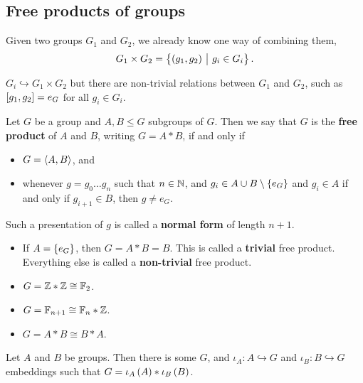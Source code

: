 \subsection{Free products of groups}

Given two groups $ G_1 $ and $ G_2 $, we already know one way of combining them,
$$ G_1 \times G_2 = \cbr{\br{g_1, g_2} \st g_i \in G_i}. $$

\begin{note*}
$ G_i \hookrightarrow G_1 \times G_2 $ but there are non-trivial relations between $ G_1 $ and $ G_2 $, such as $ \sbr{g_1, g_2} = e_G $ for all $ g_i \in G_i $.
\end{note*}

\begin{definition}
Let $ G $ be a group and $ A, B \le G $ subgroups of $ G $. Then we say that $ G $ is the \textbf{free product} of $ A $ and $ B $, writing $ G = A * B $, if and only if
\begin{itemize}
\item $ G = \left\langle A, B \right\rangle $, and
\item whenever $ g = g_0 \dots g_n $ such that $ n \in \mathbb{N} $, and $ g_i \in A \cup B \setminus \cbr{e_G} $ and $ g_i \in A $ if and only if $ g_{i + 1} \in B $, then $ g \ne e_G $.
\end{itemize}
Such a presentation of $ g $ is called a \textbf{normal form} of length $ n + 1 $.
\end{definition}

\begin{remark}
\hfill
\begin{itemize}
\item If $ A = \cbr{e_G} $, then $ G = A * B = B $. This is called a \textbf{trivial} free product. Everything else is called a \textbf{non-trivial} free product.
\item $ G = \mathbb{Z} * \mathbb{Z} \cong \mathbb{F}_2 $.
\item $ G = \mathbb{F}_{n + 1} \cong \mathbb{F}_n * \mathbb{Z} $.
\item $ G = A * B \cong B * A $.
\end{itemize}
\end{remark}

\begin{lemma}
Let $ A $ and $ B $ be groups. Then there is some $ G $, and $ \iota_A : A \hookrightarrow G $ and $ \iota_B : B \hookrightarrow G $ embeddings such that $ G = \iota_A\br{A} * \iota_B\br{B} $.
\end{lemma}

